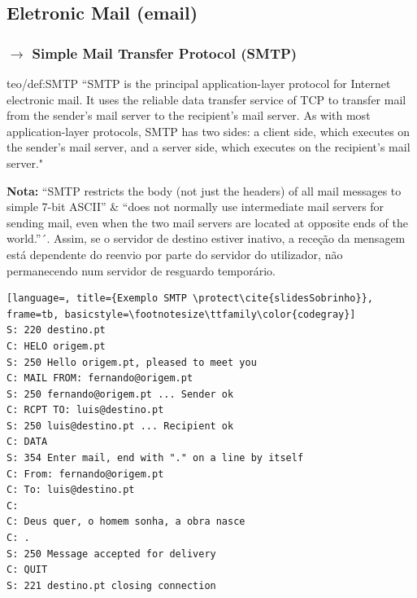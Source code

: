 \clearpage
\subsection[2.3 Eletronic Mail (email)]{\hspace*{0.075 em}\raisebox{0.2 em}{$\pmb{\drsh}$} Eletronic Mail (email)}
\label{subsec:eletronic-mail}

\subsubsection[2.3.1 Simple Mail Transfer Protocol (SMTP)]{$\pmb{\rightarrow}$ Simple Mail Transfer Protocol (SMTP)}

\begin{theo}{teo/def:SMTP}\label{teo/def:SMTP}
    ``SMTP is the principal application-layer protocol for Internet electronic mail. It uses the reliable data transfer service of TCP to transfer mail from the sender’s mail server to the recipient’s mail server. As with most application-layer protocols, SMTP has two sides: a client side, which executes on the sender’s mail server, and a server side, which executes on the recipient’s mail server."\cite{Kurose2017}
\end{theo}

\noindent \textbf{Nota:} ``SMTP restricts the body (not just the headers) of all mail messages to simple 7-bit ASCII'' \& ``does not normally use intermediate mail servers for sending mail, even when the two mail servers are located at opposite ends of the world.''´. Assim, se o servidor de destino estiver inativo, a receção da mensagem está dependente do reenvio por parte do servidor do utilizador, não permanecendo num servidor de resguardo temporário.

\begin{lstlisting}[language=, title={Exemplo SMTP \protect\cite{slidesSobrinho}}, frame=tb, basicstyle=\footnotesize\ttfamily\color{codegray}]
S: 220 destino.pt
C: HELO origem.pt
S: 250 Hello origem.pt, pleased to meet you
C: MAIL FROM: fernando@origem.pt
S: 250 fernando@origem.pt ... Sender ok
C: RCPT TO: luis@destino.pt
S: 250 luis@destino.pt ... Recipient ok
C: DATA
S: 354 Enter mail, end with "." on a line by itself
C: From: fernando@origem.pt
C: To: luis@destino.pt
C:
C: Deus quer, o homem sonha, a obra nasce
C: .
S: 250 Message accepted for delivery
C: QUIT
S: 221 destino.pt closing connection
\end{lstlisting}

